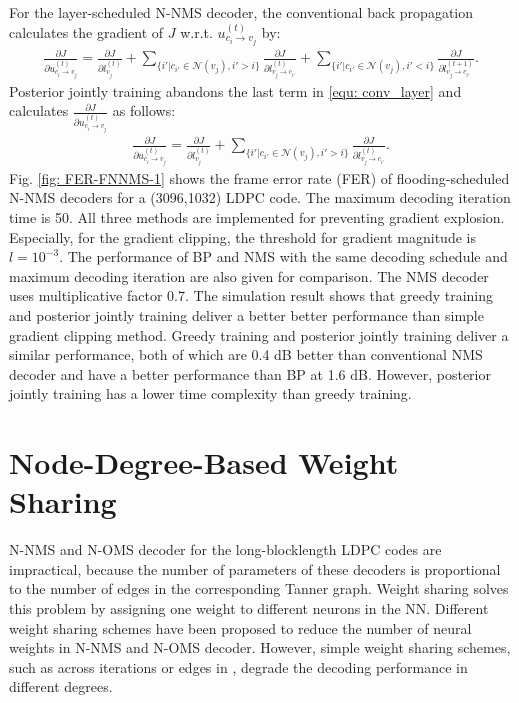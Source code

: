 \documentclass [PhD] {uclathes}
\begin{document}
For the layer-scheduled N-NMS decoder, the conventional back propagation calculates the gradient of $J$ w.r.t.  $ u^{(t)}_{c_i \rightarrow v_j}$ by:
\begin{align}\label{equ: conv_layer}
    \frac{\partial J}{\partial u^{(t)}_{c_i \rightarrow v_j}} =  \frac{\partial J}{\partial l^{(t)}_{v_j}}+ \sum_{\{i'|c_{i'}\in\mathcal{N}(v_j),i'>i\}}\frac{\partial J}{\partial l^{(t)}_{v_j \rightarrow c_{i'}}}+\sum_{\{i'|c_{i'}\in\mathcal{N}(v_j),i'<i\}}\frac{\partial J}{\partial l^{(t+1)}_{v_j \rightarrow c_{i'}}}.
\end{align}
Posterior jointly training abandons the last term in \eqref{equ: conv_layer} and calculates $\frac{\partial J}{\partial u^{(t)}_{c_i\rightarrow v_j}}$ as follows:
\begin{align}\label{equ: pt_layer}
    \frac{\partial J}{\partial u^{(t)}_{c_i \rightarrow v_j}} =  \frac{\partial J}{\partial l^{(t)}_{v_j}}+ \sum_{\{i'|c_{i'}\in\mathcal{N}(v_j),i'>i\}}\frac{\partial J}{\partial l^{(t)}_{v_j \rightarrow c_{i'}}}.
\end{align}
Fig. \ref{fig: FER-FNNMS-1} shows the frame error rate (FER) of flooding-scheduled N-NMS decoders for a (3096,1032) LDPC code. The maximum decoding iteration time is 50. All three methods are implemented for preventing gradient explosion. Especially, for the gradient clipping,  the threshold for gradient magnitude is $l=10^{-3}$. The performance of BP and NMS with the same decoding schedule and maximum decoding iteration are also given for comparison. The NMS decoder uses multiplicative factor 0.7. The simulation result shows that greedy training and posterior jointly training deliver a better better performance than simple gradient clipping method. Greedy training and posterior jointly training deliver a  similar performance, both of which are 0.4 dB better than conventional  NMS decoder and have a better performance than BP at 1.6 dB. However,  posterior jointly training has a lower time complexity than greedy training.

\section{Node-Degree-Based Weight Sharing}\label{sec: N-2D-NMS}

N-NMS and N-OMS decoder for the long-blocklength LDPC codes are impractical, because the number of parameters of these decoders is proportional to the number of edges in the corresponding Tanner graph. Weight sharing \cite{xie2021weight} solves this problem by assigning one weight to different neurons in the NN. Different weight sharing schemes have been proposed to reduce the number of neural weights in N-NMS and N-OMS decoder. However, simple weight sharing schemes, such as across iterations or edges in \cite{Wang2020-fb,Lian2019-jh}, degrade the decoding performance in different degrees. 
\end{document}
